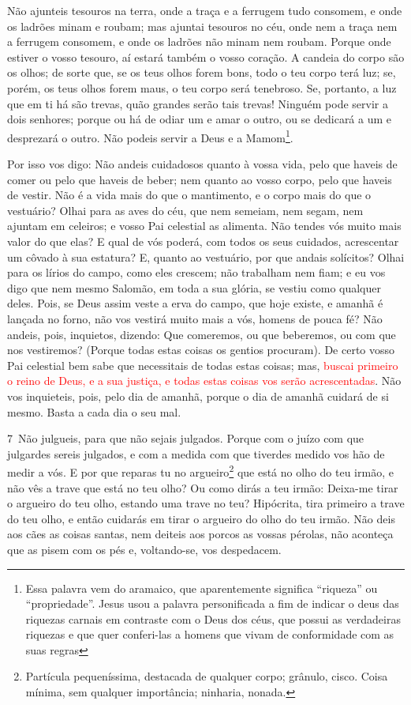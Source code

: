 Não ajunteis tesouros na terra, onde a traça e a ferrugem tudo
consomem, e onde os ladrões minam e roubam; mas ajuntai
tesouros no céu, onde nem a traça nem a ferrugem consomem, e onde os
ladrões não minam nem roubam. Porque onde estiver o vosso
tesouro, aí estará também o vosso coração. A candeia do corpo
são os olhos; de sorte que, se os teus olhos forem bons, todo o teu
corpo terá luz; se, porém, os teus olhos forem maus, o teu
corpo será tenebroso. Se, portanto, a luz que em ti há são trevas,
quão grandes serão tais trevas! Ninguém pode servir a dois
senhores; porque ou há de odiar um e amar o outro, ou se dedicará a
um e desprezará o outro. Não podeis servir a Deus e a
Mamom\footnote{Essa palavra vem do aramaico, que aparentemente
significa ``riqueza'' ou ``propriedade''. Jesus usou a palavra
personificada a fim de indicar o deus das riquezas carnais em
contraste com o Deus dos céus, que possui as verdadeiras riquezas e
que quer conferi-las a homens que vivam de conformidade com as suas
regras}.

Por isso vos digo: Não andeis cuidadosos quanto à vossa vida,
pelo que haveis de comer ou pelo que haveis de beber; nem quanto ao
vosso corpo, pelo que haveis de vestir. Não é a vida mais do que o
mantimento, e o corpo mais do que o vestuário? Olhai para as
aves do céu, que nem semeiam, nem segam, nem ajuntam em celeiros; e
vosso Pai celestial as alimenta. Não tendes vós muito mais valor do
que elas? E qual de vós poderá, com todos os seus cuidados,
acrescentar um côvado à sua estatura? E, quanto ao vestuário,
por que andais solícitos? Olhai para os lírios do campo, como eles
crescem; não trabalham nem fiam; e eu vos digo que nem mesmo
Salomão, em toda a sua glória, se vestiu como qualquer deles.
Pois, se Deus assim veste a erva do campo, que hoje existe, e
amanhã é lançada no forno, não vos vestirá muito mais a vós, homens
de pouca fé? Não andeis, pois, inquietos, dizendo: Que
comeremos, ou que beberemos, ou com que nos vestiremos?
 (Porque todas estas coisas os gentios procuram). De certo
vosso Pai celestial bem sabe que necessitais de todas estas coisas;
mas, \textcolor{red}{buscai primeiro o reino de Deus, e a sua
justiça, e todas estas coisas vos serão acrescentadas}. Não
vos inquieteis, pois, pelo dia de amanhã, porque o dia de amanhã
cuidará de si mesmo. Basta a cada dia o seu mal.

\medskip

\lettrine{7}\ Não julgueis, para que não sejais julgados.
Porque com o juízo com que julgardes sereis julgados, e com a
medida com que tiverdes medido vos hão de medir a vós. E por que
reparas tu no argueiro\footnote{Partícula pequeníssima, destacada de
qualquer corpo; grânulo, cisco. Coisa mínima, sem qualquer
importância; ninharia, nonada.} que está no olho do teu irmão, e não
vês a trave que está no teu olho? Ou como dirás a teu irmão:
Deixa-me tirar o argueiro do teu olho, estando uma trave no teu?
Hipócrita, tira primeiro a trave do teu olho, e então cuidarás
em tirar o argueiro do olho do teu irmão. Não deis aos cães as
coisas santas, nem deiteis aos porcos as vossas pérolas, não
aconteça que as pisem com os pés e, voltando-se, vos despedacem.

